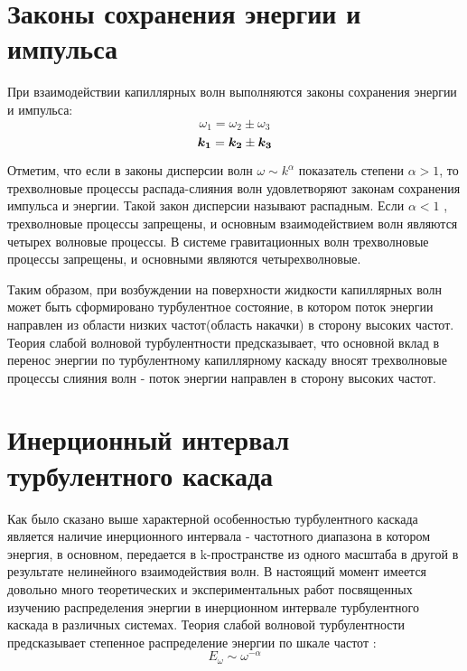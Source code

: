 \section{Законы сохранения энергии и импульса} %

При взаимодействии капиллярных волн выполняются законы сохранения энергии и импульса:
\begin{equation}
 \label{eq:saveOmega}
\omega_1 = \omega_2 \pm \omega_3
\end{equation}
\begin{equation}
 \label{eq:saveK}
\mbox{\boldmath$k_1$} = \mbox{\boldmath$k_2$} \pm \mbox{\boldmath$k_3$}
\end{equation}

Отметим, что если в законы дисперсии волн $\omega \sim k ^ \alpha$ показатель степени $\alpha > 1$, то трехволновые процессы распада-слияния волн удовлетворяют законам сохранения импульса и энергии. Такой закон дисперсии называют распадным. Если $\alpha < 1$ , трехволновые процессы запрещены, и основным взаимодействием волн являются четырех волновые процессы. В системе гравитационных волн трехволновые процессы запрещены, и основными являются четырехволновые. 

Таким образом, при возбуждении на поверхности жидкости капиллярных волн может быть сформировано турбулентное состояние, в котором поток энергии направлен из области низких частот(область накачки) в сторону высоких частот. Теория слабой волновой турбулентности \cite{Zakharov} предсказывает, что основной вклад в перенос энергии по турбулентному капиллярному каскаду вносят трехволновые процессы слияния волн - поток энергии направлен в сторону высоких частот. 


\section{Инерционный интервал турбулентного каскада}%

Как было сказано выше характерной особенностью турбулентного каскада является наличие инерционного интервала -  частотного диапазона в котором энергия, в основном, передается в k-пространстве из одного масштаба в другой в результате нелинейного взаимодействия волн. 
В настоящий момент имеется довольно много теоретических и экспериментальных работ посвященных изучению распределения энергии в инерционном интервале турбулентного каскада в различных системах. Теория слабой волновой турбулентности предсказывает степенное распределение энергии по шкале частот \cite{Zakharov}:
\begin{equation}
\label{eq:EOmega}
E_\omega \sim \omega^{-\alpha}
\end{equation}


